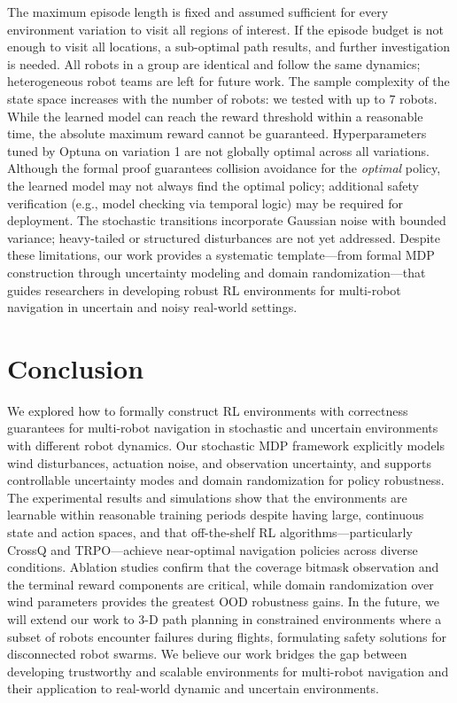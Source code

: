 \documentclass[letterpaper, 10 pt, conference]{ieeeconf}  %
\begin{document}
The maximum episode length is fixed and assumed sufficient for every environment variation to visit all regions of interest. If the episode budget is not enough to visit all locations, a sub-optimal path results, and further investigation is needed. All robots in a group are identical and follow the same dynamics; heterogeneous robot teams are left for future work. The sample complexity of the state space increases with the number of robots: we tested with up to 7 robots. While the learned model can reach the reward threshold within a reasonable time, the absolute maximum reward cannot be guaranteed. Hyperparameters tuned by Optuna on variation 1 are not globally optimal across all variations. Although the formal proof guarantees collision avoidance for the \emph{optimal} policy, the learned model may not always find the optimal policy; additional safety verification (e.g., model checking via temporal logic) may be required for deployment. The stochastic transitions incorporate Gaussian noise with bounded variance; heavy-tailed or structured disturbances are not yet addressed. Despite these limitations, our work provides a systematic template—from formal MDP construction through uncertainty modeling and domain randomization—that guides researchers in developing robust RL environments for multi-robot navigation in uncertain and noisy real-world settings.

\section{Conclusion}
\label{sec:conclusion}

We explored how to formally construct RL environments with correctness guarantees for multi-robot navigation in stochastic and uncertain environments with different robot dynamics. Our stochastic MDP framework explicitly models wind disturbances, actuation noise, and observation uncertainty, and supports controllable uncertainty modes and domain randomization for policy robustness. The experimental results and simulations show that the environments are learnable within reasonable training periods despite having large, continuous state and action spaces, and that off-the-shelf RL algorithms—particularly CrossQ and TRPO—achieve near-optimal navigation policies across diverse conditions. Ablation studies confirm that the coverage bitmask observation and the terminal reward components are critical, while domain randomization over wind parameters provides the greatest OOD robustness gains. In the future, we will extend our work to 3-D path planning in constrained environments where a subset of robots encounter failures during flights, formulating safety solutions for disconnected robot swarms. We believe our work bridges the gap between developing trustworthy and scalable environments for multi-robot navigation and their application to real-world dynamic and uncertain environments.




\end{document}
